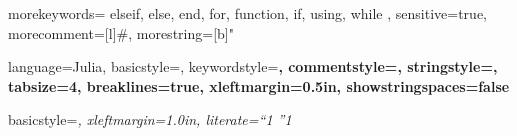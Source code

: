 \usepackage{listings}

{
	morekeywords={
		elseif, else, end, for, function, if, using, while
	},
	sensitive=true,      %
	morecomment=[l]{\#}, %
	morestring=[b]"
}


{
	language=Julia,
	basicstyle=\ttfamily,
	keywordstyle=\bfseries\color{blue},
	commentstyle=\color{ForestGreen},
	stringstyle=\color{magenta},
	tabsize=4,
	breaklines=true,
	xleftmargin=0.5in,
	showstringspaces=false %
}

{
	basicstyle=\itshape,
	xleftmargin=1.0in,
	literate={``}{\dbllq}1 {''}{\dblrq}1
}
